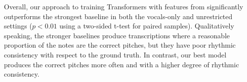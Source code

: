Overall, our approach to training Transformers with features from \jukebox{} significantly outperforms the strongest baseline in both the vocals-only and unrestricted settings (${p < 0.01}$ using a two-sided t-test for paired samples). 
Qualitatively speaking, the stronger baselines produce transcriptions where a reasonable proportion of the notes are the correct pitches, but they have poor rhythmic consistency with respect to the ground truth. 
In contrast, our best model produces the correct pitches more often and with a higher degree of rhythmic consistency.
